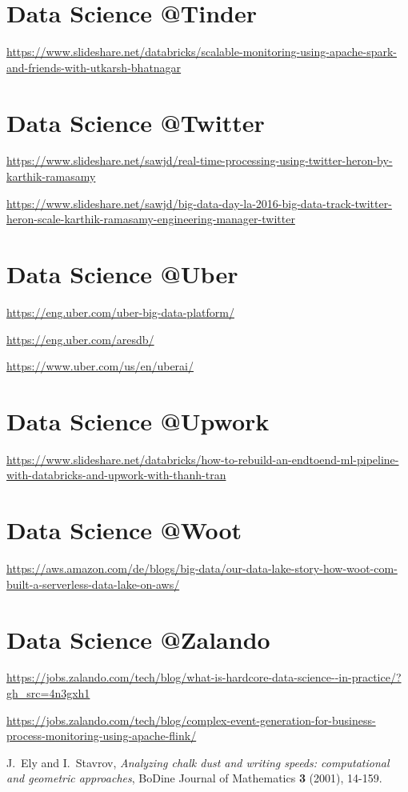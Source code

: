 \documentclass[12pt, numbers=noenddot]{scrreprt} %
\begin{document}
\section{Data Science @Tinder}
\url{https://www.slideshare.net/databricks/scalable-monitoring-using-apache-spark-and-friends-with-utkarsh-bhatnagar}

\section{Data Science @Twitter}
\url{https://www.slideshare.net/sawjd/real-time-processing-using-twitter-heron-by-karthik-ramasamy}

\url{https://www.slideshare.net/sawjd/big-data-day-la-2016-big-data-track-twitter-heron-scale-karthik-ramasamy-engineering-manager-twitter}

\section{Data Science @Uber}
\url{https://eng.uber.com/uber-big-data-platform/}

\url{https://eng.uber.com/aresdb/}

\url{https://www.uber.com/us/en/uberai/}

\section{Data Science @Upwork}
\url{https://www.slideshare.net/databricks/how-to-rebuild-an-endtoend-ml-pipeline-with-databricks-and-upwork-with-thanh-tran}

\section{Data Science @Woot}
\url{https://aws.amazon.com/de/blogs/big-data/our-data-lake-story-how-woot-com-built-a-serverless-data-lake-on-aws/}

\section{Data Science @Zalando}
\url{https://jobs.zalando.com/tech/blog/what-is-hardcore-data-science--in-practice/?gh_src=4n3gxh1}

\url{https://jobs.zalando.com/tech/blog/complex-event-generation-for-business-process-monitoring-using-apache-flink/}


\newpage

\begin{thebibliography}{99}

J.~Ely and I.~Stavrov,
\emph{Analyzing chalk dust and writing speeds: computational and geometric approaches},
BoDine Journal of Mathematics \textbf{3} (2001), 14-159.

\end{thebibliography}


\listoffigures%
\end{document}
